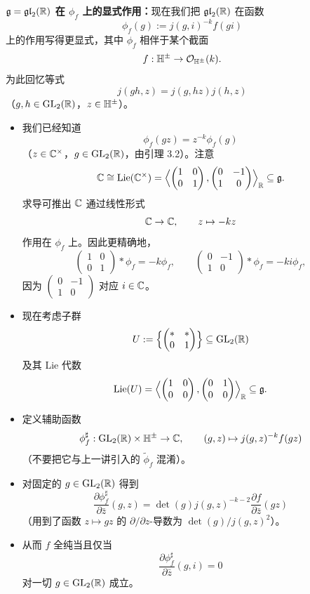 \textbf{$\mathfrak{g}=\mathfrak{gl}_2(\mathbb{R})$ 在 $\phi_f$ 上的显式作用：}现在我们把 $\mathfrak{gl}_2(\mathbb{R})$ 在函数
\[
\phi_f(g):=j(g,i)^{-k}f(gi)
\]
上的作用写得更显式，其中 $\phi_f$ 相伴于某个截面
\[
f:\mathbb{H}^\pm\to\mathcal{O}_{\mathbb{H}^\pm}(k).
\]
为此回忆等式
\[
j(gh,z)=j(g,hz)j(h,z)
\]
（$g,h\in\operatorname{GL}_2(\mathbb{R})$，$z\in\mathbb{H}^\pm$）。
\begin{itemize}
\item 我们已经知道
\[
\phi_f(gz)=z^{-k}\phi_f(g)
\]
（$z\in\mathbb{C}^\times$，$g\in\operatorname{GL}_2(\mathbb{R})$，由引理 3.2）。注意
\[
\mathbb{C}\cong\operatorname{Lie}(\mathbb{C}^\times)=\Bigl\langle\begin{pmatrix}1&0\\0&1\end{pmatrix},\begin{pmatrix}0&-1\\1&0\end{pmatrix}\Bigr\rangle_{\mathbb{R}}\subseteq\mathfrak{g}.
\]
求导可推出 $\mathbb{C}$ 通过线性形式
\[
\mathbb{C}\to\mathbb{C},\qquad z\mapsto-kz
\]
作用在 $\phi_f$ 上。因此更精确地，
\[
\begin{pmatrix}1&0\\0&1\end{pmatrix}*\phi_f=-k\phi_f,
\qquad
\begin{pmatrix}0&-1\\1&0\end{pmatrix}*\phi_f=-ki\phi_f,
\]
因为 $\begin{pmatrix}0&-1\\1&0\end{pmatrix}$ 对应 $i\in\mathbb{C}$。
\item 现在考虑子群
\[
U:=\Bigl\{\begin{pmatrix}*&*\\0&1\end{pmatrix}\Bigr\}\subseteq\operatorname{GL}_2(\mathbb{R})
\]
及其 Lie 代数
\[
\operatorname{Lie}(U)=\Bigl\langle\begin{pmatrix}1&0\\0&0\end{pmatrix},\begin{pmatrix}0&1\\0&0\end{pmatrix}\Bigr\rangle_{\mathbb{R}}\subseteq\mathfrak{g}.
\]
\item 定义辅助函数
\[
\phi_f^\sharp:\operatorname{GL}_2(\mathbb{R})\times\mathbb{H}^\pm\to\mathbb{C},\qquad(g,z)\mapsto j(g,z)^{-k}f(gz)
\]
（不要把它与上一讲引入的 $\widetilde\phi_f$ 混淆）。
\item 对固定的 $g\in\operatorname{GL}_2(\mathbb{R})$ 得到
\[
\frac{\partial\phi_f^\sharp}{\partial\bar z}(g,z)=\det(g)j(g,z)^{-k-2}\frac{\partial f}{\partial\bar z}(gz)
\]
（用到了函数 $z\mapsto gz$ 的 $\partial/\partial z$-导数为 $\det(g)/j(g,z)^2$）。
\item 从而 $f$ 全纯当且仅当
\[
\frac{\partial\phi_f^\sharp}{\partial\bar z}(g,i)=0
\]
对一切 $g\in\operatorname{GL}_2(\mathbb{R})$ 成立。
\end{itemize}
